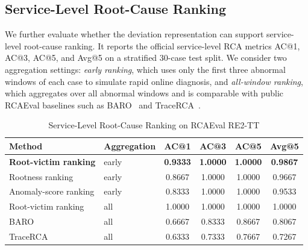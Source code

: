 \subsection{Service-Level Root-Cause Ranking}

We further evaluate whether the deviation representation can support service-level root-cause ranking.  It reports the official service-level RCA metrics AC@1, AC@3, AC@5, and Avg@5 on a stratified 30-case test split. We consider two aggregation settings: \emph{early ranking}, which uses only the first three abnormal windows of each case to simulate rapid online diagnosis, and \emph{all-window ranking}, which aggregates over all abnormal windows and is comparable with public RCAEval baselines such as BARO~\cite{pham2024baro} and TraceRCA~\cite{pham2025rcaeval}.

\begin{table}[!t]
\caption{Service-Level Root-Cause Ranking on RCAEval RE2-TT}
\label{tab:rca}
\centering
\renewcommand{\arraystretch}{1.1}
\begin{tabular}{l|l|cccc}
\hline
\textbf{Method} & \textbf{Aggregation} & \textbf{AC@1} & \textbf{AC@3} & \textbf{AC@5} & \textbf{Avg@5} \\
\hline
\textbf{Root-victim ranking} & early & \textbf{0.9333} & \textbf{1.0000} & \textbf{1.0000} & \textbf{0.9867} \\
Rootness ranking & early & 0.8667 & 1.0000 & 1.0000 & 0.9667 \\
Anomaly-score ranking & early & 0.8333 & 1.0000 & 1.0000 & 0.9533 \\
\hline
Root-victim ranking & all & 1.0000 & 1.0000 & 1.0000 & 1.0000 \\
BARO & all & 0.6667 & 0.8333 & 0.8667 & 0.8067 \\
TraceRCA & all & 0.6333 & 0.7333 & 0.7667 & 0.7267 \\
\hline
\end{tabular}
\end{table}


